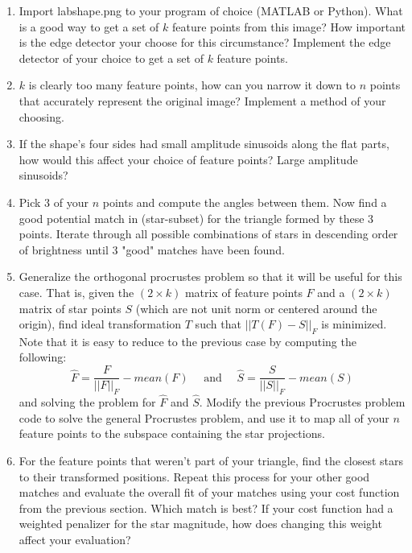 \documentclass[paper=a4, fontsize=11pt]{scrartcl} %
\begin{document}
\begin{enumerate}
  \item
  Import labshape.png to your program of choice (MATLAB or Python). What is a good way to get a set of $k$ feature points from this image? How important is the edge detector your choose for this circumstance? Implement the edge detector of your choice to get a set of $k$ feature points. 
  \item 
  $k$ is clearly too many feature points, how can you narrow it down to $n$ points that accurately represent the original image? Implement a method of your choosing. 
  \item
  If the shape's four sides had small amplitude sinusoids along the flat parts, how would this affect your choice of feature points? Large amplitude sinusoids?
  \item
  Pick $3$ of your $n$ points and compute the angles between them. Now find a good potential match in (star-subset) for the triangle formed by these 3 points. Iterate through all possible combinations of stars in descending order of brightness until 3 "good" matches have been found.
  \item
  Generalize the orthogonal procrustes problem so that it will be useful for this case. That is, given the $(2\times k)$ matrix of feature points $F$ and a  $(2\times k)$ matrix of star points $S$ (which are not unit norm or centered around the origin), find ideal transformation $T$ such that $||T(F)-S||_F$ is minimized.  Note that it is easy to reduce to the previous case by computing the following:
  $$
  \hat{F} = \frac{F}{||F||_F} - mean(F)\quad\textrm{ and }\quad\hat{S} = \frac{S}{||S||_F} - mean(S)
  $$
  and solving the problem for $\hat{F}$ and $\hat{S}$. Modify the previous Procrustes problem code to solve the general Procrustes problem, and use it to map all of your $n$ feature points to the subspace containing the star projections.
  \item
  For the feature points that weren't part of your triangle, find the closest stars to their transformed positions. Repeat this process for your other good matches and evaluate the overall fit of your matches using your cost function from the previous section. Which match is best? If your cost function had a weighted penalizer for the star magnitude, how does changing this weight affect your evaluation?
\end{enumerate}



\end{document}
